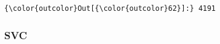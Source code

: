\documentclass[8pt,onecolumn,aps,pra]{revtex4-1}
\begin{document}
    \begin{center}
    \end{center}
    { \hspace*{\fill} \\}
    
    \begin{center}
    \end{center}
    { \hspace*{\fill} \\}
    
\begin{Verbatim}[commandchars=\\\{\}]
{\color{outcolor}Out[{\color{outcolor}62}]:} 4191
\end{Verbatim}
            
    \hypertarget{svc}{%
\subsubsection{SVC}\label{svc}}
\end{document}
